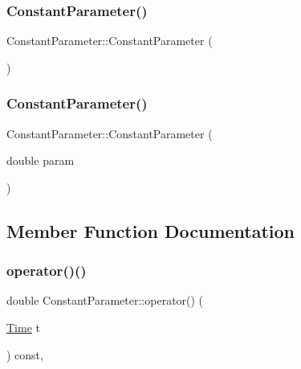 \subsubsection{\texorpdfstring{Constant\+Parameter()}{ConstantParameter()}\hspace{0.1cm}{\footnotesize\ttfamily [1/2]}}
{\footnotesize\ttfamily Constant\+Parameter\+::\+Constant\+Parameter (\begin{DoxyParamCaption}{ }\end{DoxyParamCaption})\hspace{0.3cm}{\ttfamily [default]}}

\hypertarget{class_constant_parameter_ae3bc9ec65c93b6b88fe04dcb7010d897}{}\label{class_constant_parameter_ae3bc9ec65c93b6b88fe04dcb7010d897} 
\subsubsection{\texorpdfstring{Constant\+Parameter()}{ConstantParameter()}\hspace{0.1cm}{\footnotesize\ttfamily [2/2]}}
{\footnotesize\ttfamily Constant\+Parameter\+::\+Constant\+Parameter (\begin{DoxyParamCaption}\item[{double}]{param }\end{DoxyParamCaption})}



\subsection{Member Function Documentation}
\hypertarget{class_constant_parameter_a23abb141692843e2ef68d43f610beb5e}{}\label{class_constant_parameter_a23abb141692843e2ef68d43f610beb5e} 
\subsubsection{\texorpdfstring{operator()()}{operator()()}}
{\footnotesize\ttfamily double Constant\+Parameter\+::operator() (\begin{DoxyParamCaption}\item[{\hyperlink{_name_def_8h_ac2d3e0ba793497bcca555c7c2cf64ff3}{Time}}]{t }\end{DoxyParamCaption}) const\hspace{0.3cm}{\ttfamily [override]}, {\ttfamily [virtual]}}



